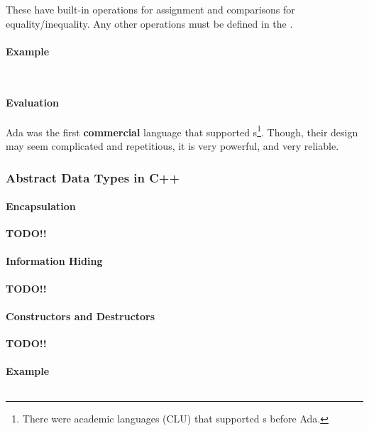 These have built-in operations for assignment and comparisons for equality/inequality.
Any other operations must be defined in the .

\paragraph{Example}\label{par:Ada_Abstract_Data_Type_Example}
\inputminted[frame=lines,linenos]{ada}{./EDAP05-Concepts_Programming_Languages-Sections/Abstract_Data_Types/Code/Class_Example-Stack-Ada-Package.ada}
\inputminted[frame=lines,linenos]{ada}{./EDAP05-Concepts_Programming_Languages-Sections/Abstract_Data_Types/Code/Class_Example-Stack-Ada.ada}

\paragraph{Evaluation}\label{par:Ada_Abstract_Data_Type_Evaluation}
Ada was the first \textbf{commercial} language that supported s\footnote{There were academic languages (CLU) that supported s before Ada.}.
Though, their design may seem complicated and repetitious, it is very powerful, and very reliable.

\subsubsection{Abstract Data Types in C++}\label{subsubsec:Abstract_Data_Types_C++}
\paragraph{Encapsulation}\label{par:C++_Encapsulation}
\textbf{TODO!!}

\paragraph{Information Hiding}\label{par:C++_Info_Hiding}
\textbf{TODO!!}

\paragraph{Constructors and Destructors}\label{par:C++_Constructors_Destructors}
\textbf{TODO!!}

\paragraph{Example}\label{par:C++_Abstract_Data_Type_Example}
\inputminted[frame=lines,linenos]{c++}{./EDAP05-Concepts_Programming_Languages-Sections/Abstract_Data_Types/Code/Class_Example-Stack-CPP.cpp}

